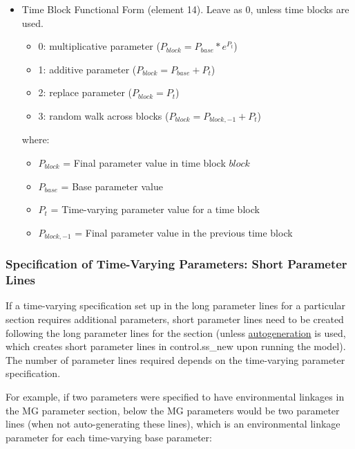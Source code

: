 \begin{itemize}
\item Time Block Functional Form (element 14). Leave as 0, unless time blocks are used.
	\begin{itemize}
		\item 0: multiplicative parameter ($P_{block} = P_{base}*e^{P_t}$)
		\item 1: additive parameter ($P_{block} = P_{base} + P_t$)
		\item 2: replace parameter ($P_{block} = P_t$)
		\item 3: random walk across blocks ($P_{block} = P_{block,-1} + P_t$)
	\end{itemize}
	where:
	\begin{itemize}
        \item $P_{block}$ = Final parameter value in time block $block$
        \item $P_{base}$ = Base parameter value
		\item $P_{t}$ = Time-varying parameter value for a time block
		\item $P_{block,-1}$ = Final parameter value in the previous time block
     \end{itemize}
\end{itemize}

\subsubsection{Specification of Time-Varying Parameters: Short Parameter Lines} 

If a time-varying specification set up in the long parameter lines for a particular section requires additional parameters, short parameter lines need to be created following the long parameter lines for the section (unless \hyperlink{autogen}{autogeneration} is used, which creates short parameter lines in control.ss\_new upon running the model). The number of parameter lines required depends on the time-varying parameter specification.

For example, if two parameters were specified to have environmental linkages in the MG parameter section, below the MG parameters would be two parameter lines (when not auto-generating these lines), which is an environmental linkage parameter for each time-varying base parameter:

